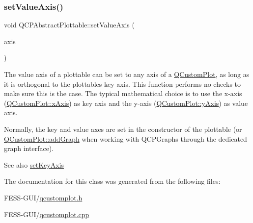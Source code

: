 \subsubsection{\texorpdfstring{set\+Value\+Axis()}{setValueAxis()}}
{\footnotesize\ttfamily void Q\+C\+P\+Abstract\+Plottable\+::set\+Value\+Axis (\begin{DoxyParamCaption}\item[{\hyperlink{class_q_c_p_axis}{Q\+C\+P\+Axis} $\ast$}]{axis }\end{DoxyParamCaption})}

The value axis of a plottable can be set to any axis of a \hyperlink{class_q_custom_plot}{Q\+Custom\+Plot}, as long as it is orthogonal to the plottable\textquotesingle{}s key axis. This function performs no checks to make sure this is the case. The typical mathematical choice is to use the x-\/axis (\hyperlink{class_q_custom_plot_a9a79cd0158a4c7f30cbc702f0fd800e4}{Q\+Custom\+Plot\+::x\+Axis}) as key axis and the y-\/axis (\hyperlink{class_q_custom_plot_af6fea5679725b152c14facd920b19367}{Q\+Custom\+Plot\+::y\+Axis}) as value axis.

Normally, the key and value axes are set in the constructor of the plottable (or \hyperlink{class_q_custom_plot_a6fb2873d35a8a8089842d81a70a54167}{Q\+Custom\+Plot\+::add\+Graph} when working with Q\+C\+P\+Graphs through the dedicated graph interface).

\begin{DoxySeeAlso}{See also}
\hyperlink{class_q_c_p_abstract_plottable_a8524fa2994c63c0913ebd9bb2ffa3920}{set\+Key\+Axis} 
\end{DoxySeeAlso}


The documentation for this class was generated from the following files\+:\begin{DoxyCompactItemize}
\item 
F\+E\+S\+S-\/\+G\+U\+I/\hyperlink{qcustomplot_8h}{qcustomplot.\+h}\item 
F\+E\+S\+S-\/\+G\+U\+I/\hyperlink{qcustomplot_8cpp}{qcustomplot.\+cpp}\end{DoxyCompactItemize}
